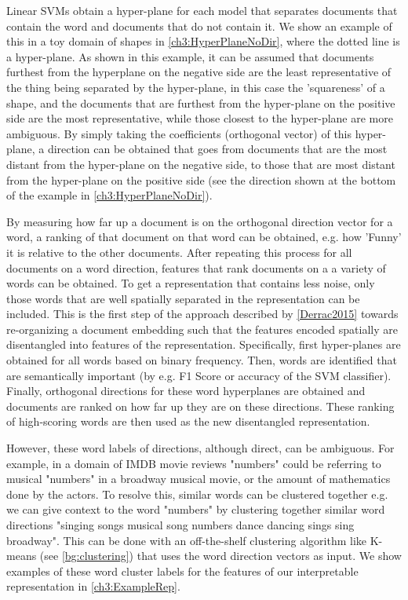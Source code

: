 Linear SVMs obtain a hyper-plane for each model that  separates documents that contain the word and documents that do not contain it. We show an example of this in a toy domain of shapes in \ref{ch3:HyperPlaneNoDir}, where the dotted line is a hyper-plane. As shown in this example, it can be assumed that documents furthest from the hyperplane on the negative side are the least representative of the thing being separated by the hyper-plane, in this case the 'squareness' of a shape, and the documents that are furthest from the hyper-plane on the positive side are the most representative, while those closest to the hyper-plane are more ambiguous. By simply taking the coefficients (orthogonal vector) of this hyper-plane, a direction can be obtained  that goes from documents that are the most distant from the hyper-plane on the negative side, to those that are most distant from the hyper-plane on the positive side (see the direction shown at the bottom of the example in \ref{ch3:HyperPlaneNoDir}).

By measuring how far up a document is on the orthogonal direction vector for a word, a ranking of that document on that word can be obtained, e.g. how 'Funny' it is relative to the other documents. After repeating this process for all documents on a word direction,  features that rank  documents on a a variety of words can be obtained. To get a representation that contains less noise, only those words that are well spatially separated in the representation can be included. This is the first step of the approach described by \ref{Derrac2015} towards re-organizing a document embedding  such that the features encoded spatially are disentangled into  features of the representation. Specifically, first  hyper-planes are obtained for all words based on binary frequency. Then,  words are identified that are semantically important (by e.g. F1 Score or accuracy of the SVM classifier). Finally, orthogonal directions for these word hyperplanes are obtained and  documents are ranked on how far up they are on these directions. These ranking of high-scoring words are then used as the new disentangled representation.

 However, these word labels of directions, although direct, can be ambiguous. For example, in a domain of IMDB movie reviews "numbers" could be referring to musical "numbers" in a broadway musical movie, or the amount of mathematics done by the actors. To resolve this, similar words can be clustered together e.g.  we can give context to the word "numbers" by clustering together similar word directions  "singing songs musical song numbers dance dancing sings sing broadway". This can be done with an off-the-shelf clustering algorithm like K-means (see \ref{bg:clustering}) that uses the word direction vectors as input. We show examples of these word cluster labels for the features of our interpretable representation in \ref{ch3:ExampleRep}.
 
